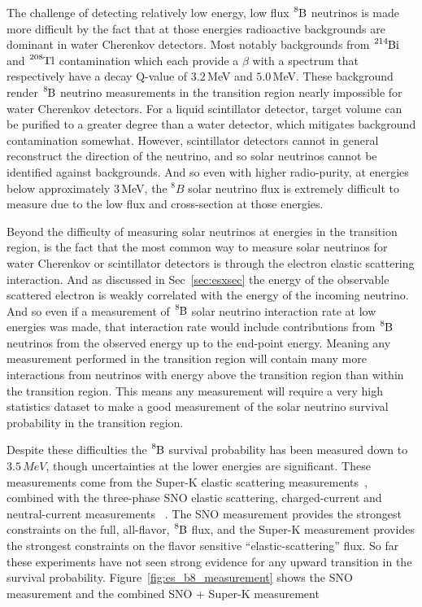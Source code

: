 The challenge of detecting relatively low energy, low flux $\ce{^{8}B}$ neutrinos
is made more difficult by the fact that at those energies radioactive backgrounds
are dominant in water Cherenkov detectors.
Most notably backgrounds from $\ce{^{214}Bi}$ and $\ce{^{208}Tl}$ contamination
which each provide a $\beta$ with a spectrum that respectively have a decay
Q-value of $3.2$\,MeV and $5.0$\,MeV.
These background render $\ce{^{8}B}$ neutrino measurements in the transition
region nearly impossible for water Cherenkov detectors.
For a liquid scintillator detector, target volume can be purified to a greater
degree than a water detector, which mitigates
background contamination somewhat.
However, scintillator detectors cannot in general reconstruct the direction
of the neutrino, and so solar neutrinos cannot be identified against backgrounds.
And so even with higher radio-purity, at energies below approximately $3$\,MeV,
the $^{8}B$ solar neutrino flux is extremely difficult to measure
due to the low flux and cross-section at those energies.

Beyond the difficulty of measuring solar neutrinos at energies in the transition
region, is the fact that the most common way to measure solar neutrinos for
water Cherenkov or scintillator detectors
is through the electron elastic scattering interaction.
And as discussed in Sec~\ref{sec:esxsec} the energy of the observable
scattered electron is weakly correlated with the energy of the incoming neutrino.
And so even if a measurement of $\ce{^{8}B}$ solar neutrino interaction rate at low energies was
made, that interaction rate would include contributions from $\ce{^{8}B}$ neutrinos
from the observed energy up to the end-point energy.
Meaning any measurement performed in the transition region will contain many
more interactions from neutrinos with energy above the transition region than within
the transition region.
This means any measurement will require a very high statistics dataset to make
a good measurement of the solar neutrino survival probability in the transition
region.

Despite these difficulties the $\ce{^{8}B}$ survival probability has been measured
down to $3.5\,MeV$, though uncertainties at the lower energies are significant.
These measurements come from the Super-K elastic scattering measurements~\citep{superk4}, combined
with the three-phase SNO elastic scattering, charged-current and neutral-current measurements
~\citep{sno_combined}.
The SNO measurement provides the strongest constraints on the full, all-flavor, $\ce{^{8}B}$
flux, and the Super-K measurement provides the strongest constraints on the
flavor sensitive ``elastic-scattering'' flux.
So far these experiments have not seen strong evidence for any
upward transition in the survival probability.
Figure~\ref{fig:es_b8_measurement} shows the SNO measurement
and the combined SNO + Super-K  measurement

